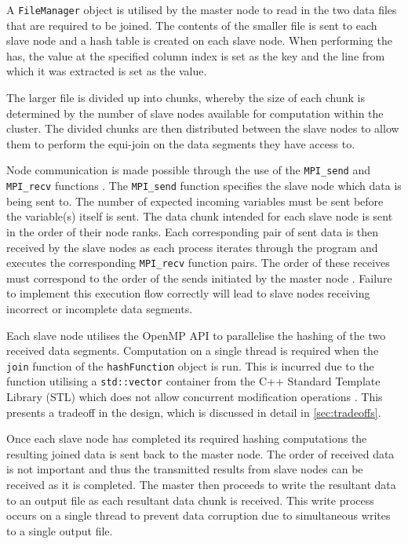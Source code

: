 \documentclass[10pt,twocolumn]{witseiepaper}
\begin{document}
A \texttt{FileManager} object is utilised by the master node to read in the two data files that are required to be joined. The contents of the smaller file is sent to each slave node and a hash table is created on each slave node. When performing the has, the value at the specified column index is set as the key and the line from which it was extracted is set as the value.

The larger file is divided up into chunks, whereby the size of each chunk is determined by the number of slave nodes available for computation within the cluster. The divided chunks are then distributed between the slave nodes to allow them to perform the equi-join on the data segments they have access to.

Node communication is made possible through the use of the \texttt{MPI\_send} and \texttt{MPI\_recv} functions \cite{mpi-send}. The \texttt{MPI\_send} function specifies the slave node which data is being sent to. The number of expected incoming variables must be sent before the variable(s) itself is sent. The data chunk intended for each slave node is sent in the order of their node ranks. Each corresponding pair of sent data is then received by the slave nodes as each process iterates through the program and executes the corresponding \texttt{MPI\_recv} function pairs. The order of these receives must correspond to the order of the sends initiated by the master node \cite{mpi-send}. Failure to implement this execution flow correctly will lead to slave nodes receiving incorrect or incomplete data segments.

Each slave node utilises the OpenMP API to parallelise the hashing of the two received data segments. Computation on a single thread is required when the \texttt{join} function of the \texttt{hashFunction} object is run. This is incurred due to the function utilising a \texttt{std::vector} container from the C++ Standard Template Library (STL) which does not allow concurrent modification operations \cite{stl-vector}. This presents a tradeoff in the design, which is discussed in detail in \ref{sec:tradeoffs}.

Once each slave node has completed its required hashing computations the resulting joined data is sent back to the master node. The order of received data is not important and thus the transmitted results from slave nodes can be received as it is completed. The master then proceeds to write the resultant data to an output file as each resultant data chunk is received. This write process occurs on a single thread to prevent data corruption due to simultaneous writes to a single output file.
\end{document}
